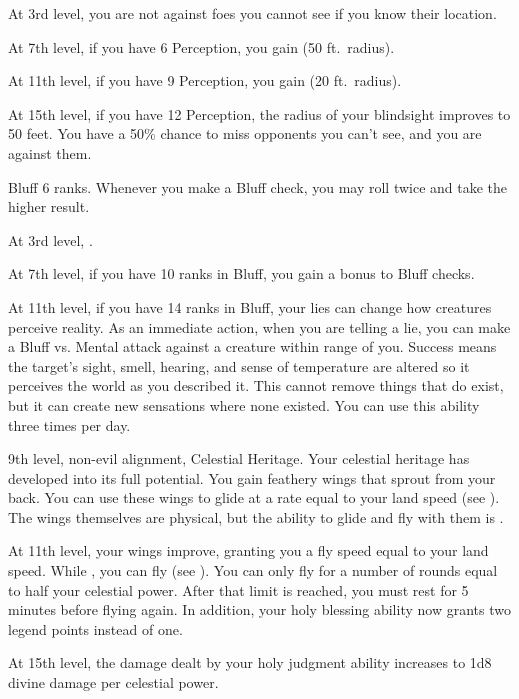     At 3rd level, you are not  against foes you cannot see if you know their location.

    At 7th level, if you have 6 Perception, you gain  (50 ft.\ radius).

    At 11th level, if you have 9 Perception, you gain  (20 ft.\ radius).

    At 15th level, if you have 12 Perception, the radius of your blindsight improves to 50 feet.
     You have a 50\% chance to miss opponents you can't see, and you are  against them.

    \featpre Bluff 6 ranks.
    \featben Whenever you make a Bluff check, you may roll twice and take the higher result.

    At 3rd level, \tdash.

    At 7th level, if you have 10 ranks in Bluff, you gain a  bonus to Bluff checks.

    At 11th level, if you have 14 ranks in Bluff, your lies can change how creatures perceive reality.
    As an immediate action, when you are telling a lie, you can make a Bluff vs. Mental attack against a creature within \rngmed range of you.
    Success means the target's sight, smell, hearing, and sense of temperature are altered so it perceives the world as you described it.
    This cannot remove things that do exist, but it can create new sensations where none existed.
    You can use this ability three times per day.
    \magical

    \featpres 9th level, non-evil alignment, Celestial Heritage.
    \featben Your celestial heritage has developed into its full potential.
    You gain feathery wings that sprout from your back.
    You can use these wings to glide at a rate equal to your land speed (see ).
    The wings themselves are physical, but the ability to glide and fly with them is .

    At 11th level, your wings improve, granting you a fly speed equal to your land speed.
    While , you can fly (see ).
    You can only fly for a number of rounds equal to half your celestial power.
    After that limit is reached, you must rest for 5 minutes before flying again.
    In addition, your holy blessing ability now grants two legend points instead of one.

    At 15th level, the damage dealt by your holy judgment ability increases to 1d8 divine damage per celestial power.


